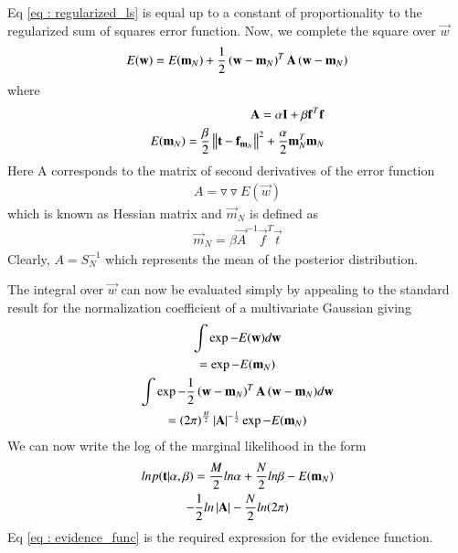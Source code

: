 \documentclass[journal,12pt,twocolumn]{IEEEtran}
\begin{document}
Eq \eqref{eq : regularized_ls} is equal up to a constant of proportionality to the regularized sum of squares error function. Now, we complete the square over $\vec{w}$
\begin{align}
    E(\mathbf{w}) = E(\mathbf{m}_{N}) + \frac{1}{2}\left(\mathbf{w} - \mathbf{m}_{N}\right)^{T}\mathbf{A}\left(\mathbf{w} - \mathbf{m}_{N}\right)
\end{align}
where 
\begin{align}
    \mathbf{A} = \alpha\mathbf{I} + \beta \mathbf{f}^T \mathbf{f}\\
    E(\mathbf{m}_{N}) = \frac{\beta}{2}\left\lVert\mathbf{t} - \mathbf{f}_{\mathbf{m}_{N}}\right\rVert^2 + \frac{\alpha}{2}\mathbf{m}_{N}^T\mathbf{m}_{N}
\end{align}
Here A corresponds to the matrix of second derivatives of the error function
\begin{align}
    A = \triangledown \triangledown E(\vec{w})
\end{align}
which is known as Hessian matrix and $\vec{m}_{N}$ is defined as
\begin{align}
    \vec{m}_{N} = \beta\vec{A}^{-1}\vec{f}^{T}\vec{t}
\end{align}
Clearly, $A = S_{N}^{-1}$ which represents the mean of the posterior distribution.

The integral over $\vec{w}$ can now be evaluated simply by appealing to the standard result for the normalization coefficient of a multivariate Gaussian giving
\begin{multline}
    \int \exp{-E(\mathbf{w})}d\mathbf{w}\\
    = \exp{-E(\mathbf{m}_{N})}\\
    \int \exp{-\frac{1}{2}\ensuremath{\left(\mathbf{w} - \mathbf{m}_{N}\right)}^{T}\mathbf{A}\ensuremath{\left(\mathbf{w} - \mathbf{m}_{N}\right)}}d\mathbf{w}\\
    = (2\pi)^{\frac{M}{2}} \left\vert\mathbf{A}\right\vert^{-\frac{1}{2}}\exp{-E(\mathbf{m}_{N})}
\end{multline}
We can now write the log of the marginal likelihood in the form
\begin{multline}
    ln p(\mathbf{t} | \alpha,\beta) = \frac{M}{2}ln \alpha + \frac{N}{2}ln \beta - E(\mathbf{m}_{N})\\
    - \frac{1}{2}ln \left\vert\mathbf{A}\right\vert - \frac{N}{2}ln(2\pi) \label{eq : evidence_func}
\end{multline}
Eq \eqref{eq : evidence_func} is the required expression for the evidence function.
\end{document}
